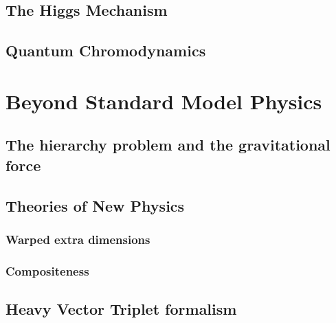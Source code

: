 \subsection{The Higgs Mechanism}
\subsection{Quantum Chromodynamics}
\label{sec:theory:qcd}
\section{Beyond Standard Model Physics}
\subsection{The hierarchy problem and the gravitational force}
\subsection{Theories of New Physics}
\subsubsection{Warped extra dimensions}
\label{sec:theory:wed}
\subsubsection{Compositeness}
\subsection{Heavy Vector Triplet formalism}
\label{sec:theory:hvt}
	